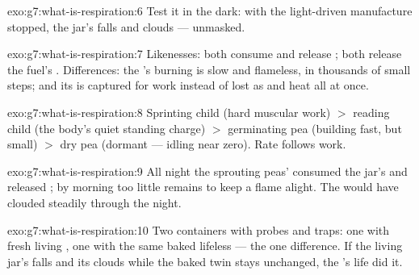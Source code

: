 \begin{solution}{exo:g7:what-is-respiration:6}
Test it in the dark: with the light-driven manufacture
stopped, the jar's  falls and  clouds ---
 unmasked.
\end{solution}

\begin{solution}{exo:g7:what-is-respiration:7}
Likenesses: both consume  and release ;
both release the fuel's . Differences: the 's
burning is slow and flameless, in thousands of small steps;
and its  is captured for work instead of lost as
 and heat all at once.
\end{solution}

\begin{solution}{exo:g7:what-is-respiration:8}
Sprinting child (hard muscular work) $>$ reading child (the
body's quiet standing charge) $>$ germinating pea (building
fast, but small) $>$ dry pea (dormant --- 
idling near zero). Rate follows work.
\end{solution}

\begin{solution}{exo:g7:what-is-respiration:9}
All night the sprouting peas'  consumed the
jar's  and released ; by morning too
little  remains to keep a flame alight. The 
would have clouded steadily through the night.
\end{solution}

\begin{solution}{exo:g7:what-is-respiration:10}
Two containers with probes and  traps: one with
fresh living , one with the same  baked lifeless
--- the one difference. If the living jar's  falls
and its  clouds while the baked twin stays
unchanged, the 's life did it.
\end{solution}

